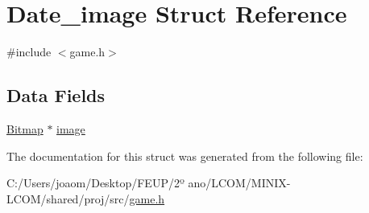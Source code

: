 \hypertarget{struct_date__image}{}\section{Date\+\_\+image Struct Reference}
\label{struct_date__image}


{\ttfamily \#include $<$game.\+h$>$}

\subsection*{Data Fields}
\begin{DoxyCompactItemize}
\item 
\mbox{\hyperlink{struct_bitmap}{Bitmap}} $\ast$ \mbox{\hyperlink{group__game_ga801bef0ab9d72c95bc5d6d6a0d8f2db0}{image}}
\end{DoxyCompactItemize}


The documentation for this struct was generated from the following file\+:\begin{DoxyCompactItemize}
\item 
C\+:/\+Users/joaom/\+Desktop/\+F\+E\+U\+P/2º ano/\+L\+C\+O\+M/\+M\+I\+N\+I\+X-\/\+L\+C\+O\+M/shared/proj/src/\mbox{\hyperlink{game_8h}{game.\+h}}\end{DoxyCompactItemize}
